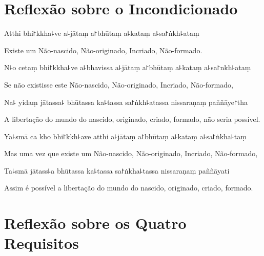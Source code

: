 \documentclass[
  babelLanguage=english,
  final,
  webversion,
]{chantingbook}
\begin{document}
\chapter[Incondicionado]{Reflexão sobre o Incondicionado}


\begin{leader}
\end{leader}

Atthi bhi꜓kkha꜕ve a꜕jātaṃ a꜓bhūtaṃ a꜕kataṃ a꜕sa꜓ṅkh꜕ataṃ

\begin{english}
  Existe um Não-nascido, Não-originado, Incriado, Não-formado.
\end{english}

N꜕o cetaṃ bhi꜓kkha꜕ve a꜕bhavissa a꜕jātaṃ a꜓bhūtaṃ a꜕kataṃ a꜕sa꜓nkh꜕ataṃ

\begin{english}
 Se não existisse este Não-nascido, Não-originado, Incriado, Não-formado,
\end{english}

Na꜕ yidaṃ jātassa꜕ bhūtassa ka꜕tassa sa꜓ṅkh꜕atassa nissaraṇaṃ paññāye꜓tha

\begin{english}
  A libertação do mundo do nascido, originado, criado, formado, não seria possível.
\end{english}

Ya꜕smā ca kho bhi꜓kkh꜕ave atthi a꜕jātaṃ a꜓bhūtaṃ a꜕kataṃ a꜕sa꜓ṅkha꜕taṃ

\begin{english}
  Mas uma vez que existe um Não-nascido, Não-originado, Incriado, Não-formado,
\end{english}

Ta꜕smā jātass꜕a bhūtassa ka꜕tassa sa꜓ṅkha꜕tassa nissaraṇaṃ paññāyati

\begin{english}
  Assim é possível a libertação do mundo do nascido, originado, criado, formado.
\end{english}

\chapter[Quatro Requisitos]{Reflexão sobre os Quatro Requisitos}


\begin{leader}
\end{leader}
\end{document}
